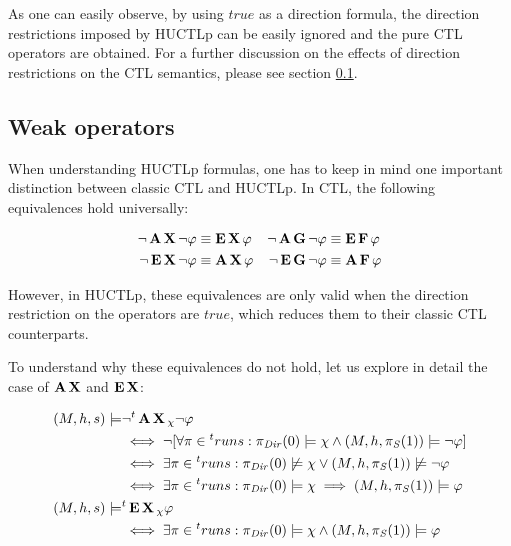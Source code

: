 As one can easily observe, by using $true$ as a direction formula, the direction restrictions imposed by \ac{HUCTLp} can be easily ignored and the pure \ac{CTL} operators are obtained. For a further discussion on the effects of direction restrictions on the \ac{CTL} semantics, please see section \ref{sec:weak}.

\subsection{Weak operators}
\label{sec:weak}

When understanding \ac{HUCTLp} formulas, one has to keep in mind one important distinction between classic \ac{CTL} and \ac{HUCTLp}. In \ac{CTL}, the following equivalences hold universally:

\begin{align*}
	\neg \operatorname{\mathbf{A}}\operatorname{\mathbf{X}} \neg \varphi 			& \equiv \operatorname{\mathbf{E}}\operatorname{\mathbf{X}} \varphi &
	\neg \operatorname{\mathbf{A}}\operatorname{\mathbf{G}} \neg \varphi 			& \equiv \operatorname{\mathbf{E}}\operatorname{\mathbf{F}} \varphi \\
	\neg \operatorname{\mathbf{E}}\operatorname{\mathbf{X}} \neg \varphi 			& \equiv \operatorname{\mathbf{A}}\operatorname{\mathbf{X}} \varphi &
	\neg \operatorname{\mathbf{E}}\operatorname{\mathbf{G}} \neg \varphi 			& \equiv \operatorname{\mathbf{A}}\operatorname{\mathbf{F}} \varphi \\
\end{align*}

However, in \ac{HUCTLp}, these equivalences are only valid when the direction restriction on the operators are $true$, which reduces them to their classic \ac{CTL} counterparts.

To understand why these equivalences do not hold, let us explore in detail the case of $\operatorname{\mathbf{A}}\operatorname{\mathbf{X}}$ and $\operatorname{\mathbf{E}}\operatorname{\mathbf{X}}$:

\begin{align*}
		(M, h, s) \models & \neg {}^{t}\operatorname{\mathbf{A}}\operatorname{\mathbf{X}}{}_{\chi} \neg \varphi	\\	
			& \iff  \neg [ \forall \pi \in {}^{t}runs  : \pi_{\mathit{Dir}}(0) \models \chi \land (M, h, \pi_{\mathit{S}}(1)) \models \neg \varphi ] \\
			& \iff  \exists \pi \in {}^{t}runs  : \pi_{\mathit{Dir}}(0) \not\models \chi \lor (M, h, \pi_{\mathit{S}}(1)) \not\models \neg \varphi \\ 
			& \iff  \exists \pi \in {}^{t}runs  : \pi_{\mathit{Dir}}(0) \models \chi \implies (M, h, \pi_{\mathit{S}}(1)) \models \varphi \\
		(M, h, s) \models & {}^{t}\operatorname{\mathbf{E}}\operatorname{\mathbf{X}}{}_{\chi} \varphi \\		
			& \iff \exists \pi \in {}^{t}runs  : \pi_{\mathit{Dir}}(0) \models \chi \land (M, h, \pi_{\mathit{S}}(1)) \models \varphi \\
\end{align*}

